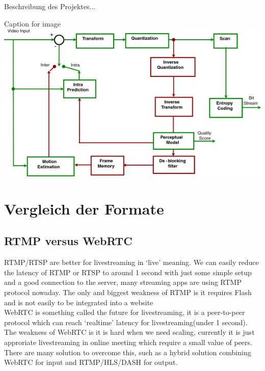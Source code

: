 Beschreibung des Projektes...

\begin{minipage}{\textwidth}
    \begin{center}
        Caption for image
        \includegraphics[scale=4.0]{img/h264.jpg} 
    \end{center}
\end{minipage}




\newpage
\section{Vergleich der Formate}

\subsection{RTMP versus WebRTC}
RTMP/RTSP are better for livestreaming in ‘live’ meaning. We can easily reduce the latency of RTMP or RTSP to around 1 second with just some simple setup and a good connection to the server, many streaming apps are using RTMP protocol nowaday. The only and biggest weakness of RTMP is it requires Flash and is not easily to be integrated into a website\\

WebRTC is something called the future for livestreaming, it is a peer-to-peer protocol which can reach ‘realtime’ latency for livestreaming(under 1 second). The weakness of WebRTC is it is hard when we need scaling, currently it is just approriate livestreaming in online meeting which require a small value of peers. There are many solution to overcome this, such as a hybrid solution combining WebRTC for input and RTMP/HLS/DASH for output.

















